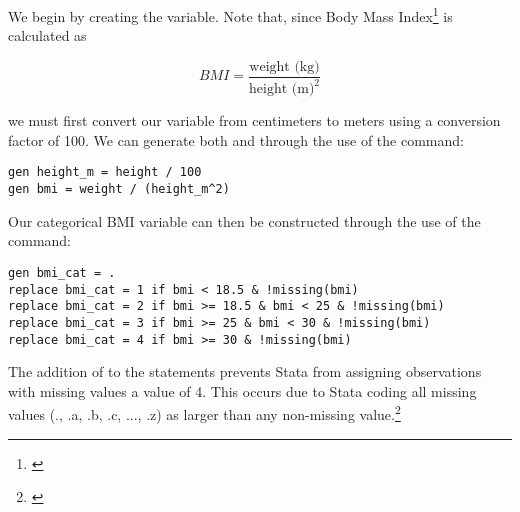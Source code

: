 

We begin by creating the  variable. Note that, since Body Mass Index\footnote{\cite{who_2000}} is calculated as

\vspace{-1em}

\begin{equation*}
    BMI = \frac{\text{weight (kg)}}{\text{height (m)}^2}
\end{equation*}

we must first convert our  variable from centimeters to meters using a conversion factor of 100. We can generate both  and  through the use of the  command:

\begin{verbatim}
gen height_m = height / 100
gen bmi = weight / (height_m^2)
\end{verbatim}

Our categorical BMI variable  can then be constructed through the use of the  command:

\begin{verbatim}
gen bmi_cat = .
replace bmi_cat = 1 if bmi < 18.5 & !missing(bmi)
replace bmi_cat = 2 if bmi >= 18.5 & bmi < 25 & !missing(bmi)
replace bmi_cat = 3 if bmi >= 25 & bmi < 30 & !missing(bmi)
replace bmi_cat = 4 if bmi >= 30 & !missing(bmi)    
\end{verbatim}

The addition of  to the  statements prevents Stata from assigning observations with missing  values a  value of 4. This occurs due to Stata coding all missing values (., .a, .b, .c, ..., .z) as larger than any non-missing value.\footnote{\cite{gould_stata}}


